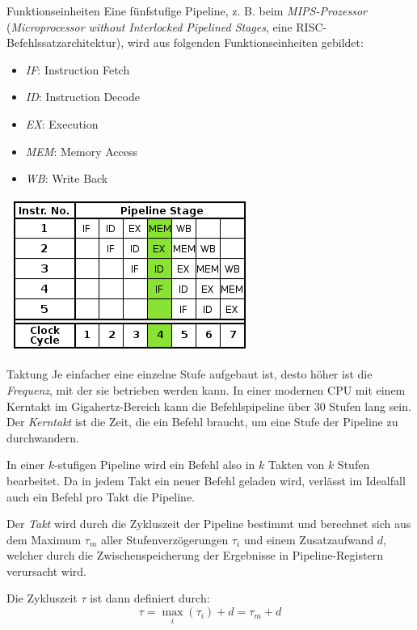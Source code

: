 \begin{defi}[Pipelining]{Funktionseinheiten}
    Eine fünfstufige Pipeline, z. B. beim \emph{MIPS-Prozessor} (\emph{Microprocessor without Interlocked Pipelined Stages}, eine RISC-Befehlssatzarchitektur), wird aus folgenden Funktionseinheiten gebildet:
    \begin{itemize}
        \item \emph{IF}: Instruction Fetch
        \item \emph{ID}: Instruction Decode
        \item \emph{EX}: Execution
        \item \emph{MEM}: Memory Access
        \item \emph{WB}: Write Back
    \end{itemize}

    \centering
    \includegraphics[width=0.5\linewidth]{images/5_stage_pipeline.png}
\end{defi}

\begin{defi}[Pipelining]{Taktung}
    Je einfacher eine einzelne Stufe aufgebaut ist, desto höher ist die \emph{Frequenz}, mit der sie betrieben werden kann.
    In einer modernen CPU mit einem Kerntakt im Gigahertz-Bereich kann die Befehlspipeline über 30 Stufen lang sein.
    Der \emph{Kerntakt} ist die Zeit, die ein Befehl braucht, um eine Stufe der Pipeline zu durchwandern.

    In einer $k$-stufigen Pipeline wird ein Befehl also in $k$ Takten von $k$ Stufen bearbeitet.
    Da in jedem Takt ein neuer Befehl geladen wird, verlässt im Idealfall auch ein Befehl pro Takt die Pipeline.

    Der \emph{Takt} wird durch die Zykluszeit der Pipeline bestimmt und berechnet sich aus dem Maximum $\tau_{m}$ aller Stufenverzögerungen $\tau_{i}$ und einem Zusatzaufwand $d$, welcher durch die Zwischenspeicherung der Ergebnisse in Pipeline-Registern verursacht wird.

    Die Zykluszeit $\tau$ ist dann definiert durch:
    \[
        \tau = \max_i (\tau_i) + d = \tau_m + d
    \]
\end{defi}

